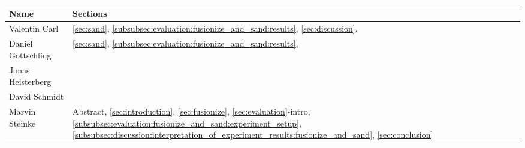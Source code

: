 \documentclass[a4paper, twoside]{IEEEtran}
\begin{document}
\vspace{1em}
\begin{center}
    \begin{tabular}{l l} \toprule
        Name & Sections \\ \midrule
        Valentin Carl &
            \ref{sec:sand},
            \ref{subsubsec:evaluation:fusionize_and_sand:results},
            \ref{sec:discussion},
            \\
        Daniel Gottschling &
            \ref{sec:sand},
            \ref{subsubsec:evaluation:fusionize_and_sand:results},
            \\
        Jonas Heisterberg & \\
        David Schmidt & \\
        Marvin Steinke & \makecell[l]{
            Abstract,
            \ref{sec:introduction},
            \ref{sec:fusionize},
            \ref{sec:evaluation}-intro, \\
            \ref{subsubsec:evaluation:fusionize_and_sand:experiment_setup},
            \ref{subsubsec:discussion:interpretation_of_experiment_results:fusionize_and_sand},
            \ref{sec:conclusion}
        }\\ \bottomrule
    \end{tabular}
\end{center}
\end{document}
